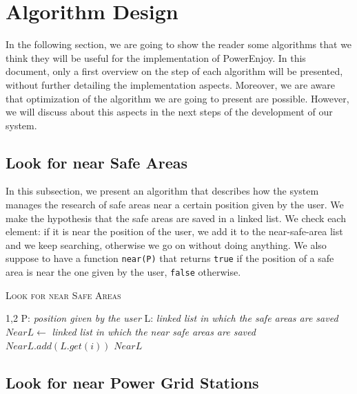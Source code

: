 \section{Algorithm Design} \label{sec:algo}

In the following section, we are going to show the reader some algorithms that we think they will be useful for the implementation of PowerEnjoy.
In this document, only a first overview on the step of each algorithm will be presented, without further detailing the implementation aspects. Moreover, we are aware that optimization of the algorithm we are going to present are possible.
However, we will discuss about this aspects in the next steps of the development of our system.

\subsection{Look for near Safe Areas} \label{subsec:near-safe-area}

In this subsection, we present an algorithm that describes how the system manages the research of safe areas near a certain position given by the user. 
We make the hypothesis that the safe areas are saved in a linked list.
We check each element: if it is near the position of the user, we add it to the near-safe-area list and we keep searching, otherwise we go on without doing anything.
We also suppose to have a function \texttt{near(P)} that returns \texttt{true} if the position of a safe area is near the one given by the user, \texttt{false} otherwise.

\vspace{32pt}
\begin{algorithm}[h!tb]
\caption{\textsc{Look for near Safe Areas}}
\label{alg:near-safe-area}
\begin{algorithmic}[1]
\begin{spacing}{1,2}
\State P: \textit{position given by the user}
\State L: \textit{linked list in which the safe areas are saved}
\State $NearL \leftarrow $ \textit{linked list in which the near safe areas are saved}
		\State $NearL.add(L.get(i))$
	\EndIf
\EndFor
\State\Return $NearL$
\EndFunction
\end{spacing}
\end{algorithmic}
\end{algorithm}

\clearpage

\subsection{Look for near Power Grid Stations} \label{subsec:near-stations}

